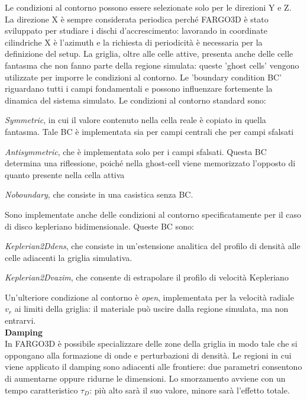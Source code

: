 Le condizioni al contorno possono essere selezionate solo per le direzioni Y e Z. La direzione X è sempre considerata periodica perché FARGO3D è stato sviluppato per studiare i dischi d'accrescimento: lavorando in coordinate cilindriche X è l'azimuth e la richiesta di periodicità è necessaria per la definizione del setup.
La griglia, oltre alle celle attive, presenta anche delle celle fantasma che non fanno parte della regione simulata: queste 'ghost cells' vengono utilizzate per imporre le condizioni al contorno.
Le 'boundary condition BC' riguardano tutti i campi fondamentali e possono influenzare fortemente la dinamica del sistema simulato.
Le condizioni al contorno standard sono:
\begin{list}{\textbf{-}}{\setlength{\itemsep}{0cm}}
    \item \textit{Symmetric}, in cui il valore contenuto nella cella reale è copiato in quella fantasma. Tale BC è implementata sia per campi centrali che per campi sfalsati
    \item \textit{Antisymmetric}, che è implementata solo per i campi sfalsati. Questa BC determina una riflessione, poiché nella ghost-cell viene memorizzato l'opposto di quanto presente nella cella attiva
    \item \textit{Noboundary}, che consiste in una casistica senza BC.
\end{list}
Sono implementate anche delle condizioni al contorno specificatamente per il caso di disco kepleriano bidimensionale. Queste BC sono:
\begin{list}{\textbf{-}}{\setlength{\itemsep}{0cm}}
    \item \textit{Keplerian2Ddens}, che consiste in un'estensione analitica del profilo di densità alle celle adiacenti la griglia simulativa.
    \item \textit{Keplerian2Dvazim}, che consente di estrapolare il profilo di velocità Kepleriano
\end{list}
Un'ulteriore condizione al contorno è \textit{open}, implementata per la velocità radiale $v_r$ ai limiti della griglia: il materiale può uscire dalla regione simulata, ma non entrarvi.\\
\newpage
\textbf{Damping}\\

In FARGO3D è possibile specializzare delle zone della griglia in modo tale che si oppongano alla formazione di onde e perturbazioni di densità.
Le regioni in cui viene applicato il damping sono adiacenti alle frontiere: due parametri consentono di aumentarne oppure ridurne le dimensioni.
Lo smorzamento avviene con un tempo caratteristico $\tau_D$: più alto sarà il suo valore, minore sarà l'effetto totale.

